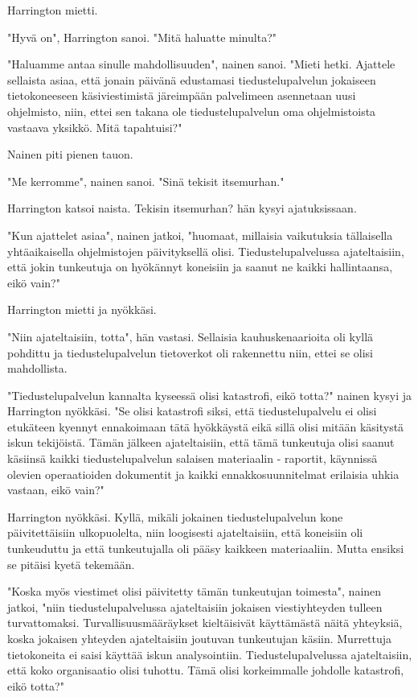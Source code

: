 Harrington mietti.


"Hyvä on", Harrington sanoi. "Mitä haluatte minulta?"


"Haluamme antaa sinulle mahdollisuuden", nainen sanoi. "Mieti hetki. Ajattele sellaista asiaa, että jonain päivänä edustamasi tiedustelupalvelun jokaiseen tietokoneeseen käsiviestimistä järeimpään palvelimeen asennetaan uusi ohjelmisto, niin, ettei sen takana ole tiedustelupalvelun oma ohjelmistoista vastaava yksikkö. Mitä tapahtuisi?"


Nainen piti pienen tauon.


"Me kerromme", nainen sanoi. "Sinä tekisit itsemurhan."


Harrington katsoi naista. Tekisin itsemurhan? hän kysyi ajatuksissaan.


"Kun ajattelet asiaa", nainen jatkoi, "huomaat, millaisia vaikutuksia tällaisella yhtäaikaisella ohjelmistojen päivityksellä olisi. Tiedustelupalvelussa ajateltaisiin, että jokin tunkeutuja on hyökännyt koneisiin ja saanut ne kaikki hallintaansa, eikö vain?"


Harrington mietti ja nyökkäsi.


"Niin ajateltaisiin, totta", hän vastasi. Sellaisia kauhuskenaarioita oli kyllä pohdittu ja tiedustelupalvelun tietoverkot oli rakennettu niin, ettei se olisi mahdollista.


"Tiedustelupalvelun kannalta kyseessä olisi katastrofi, eikö totta?" nainen kysyi ja Harrington nyökkäsi. "Se olisi katastrofi siksi, että tiedustelupalvelu ei olisi etukäteen kyennyt ennakoimaan tätä hyökkäystä eikä sillä olisi mitään käsitystä iskun tekijöistä. Tämän jälkeen ajateltaisiin, että tämä tunkeutuja olisi saanut käsiinsä kaikki tiedustelupalvelun salaisen materiaalin - raportit, käynnissä olevien operaatioiden dokumentit ja kaikki ennakkosuunnitelmat erilaisia uhkia vastaan, eikö vain?"


Harrington nyökkäsi. Kyllä, mikäli jokainen tiedustelupalvelun kone päivitettäisiin ulkopuolelta, niin loogisesti ajateltaisiin, että koneisiin oli tunkeuduttu ja että tunkeutujalla oli pääsy kaikkeen materiaaliin. Mutta ensiksi se pitäisi kyetä tekemään.


"Koska myös viestimet olisi päivitetty tämän tunkeutujan toimesta", nainen jatkoi, "niin tiedustelupalvelussa ajateltaisiin jokaisen viestiyhteyden tulleen turvattomaksi. Turvallisuusmääräykset kieltäisivät käyttämästä näitä yhteyksiä, koska jokaisen yhteyden ajateltaisiin joutuvan tunkeutujan käsiin. Murrettuja tietokoneita ei saisi käyttää iskun analysointiin. Tiedustelupalvelussa ajateltaisiin, että koko organisaatio olisi tuhottu. Tämä olisi korkeimmalle johdolle katastrofi, eikö totta?"


